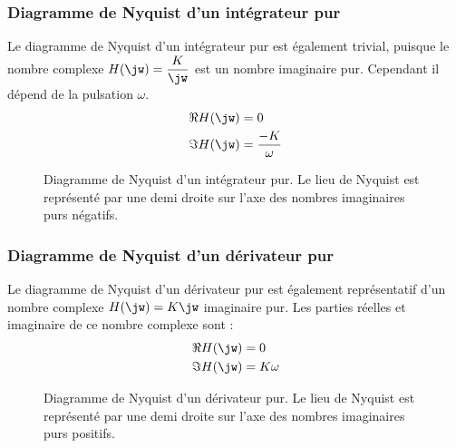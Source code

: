 \subsubsection{Diagramme de Nyquist d'un intégrateur pur}
Le diagramme de Nyquist d'un intégrateur pur est également trivial, puisque 
le nombre complexe $H(\jw)=\dfrac{K}{\jw}$ est un nombre imaginaire pur. 
Cependant il dépend de la pulsation $\omega$.
\begin{align*}
    \Re{H(\jw)}&=0\\
    \Im{H(\jw)}&=\dfrac{-K}{\omega}
\end{align*}
\begin{figure}[!h]
    \centering
    
    \caption{Diagramme de Nyquist d'un intégrateur pur. Le lieu de Nyquist 
             est représenté par une demi droite sur l'axe des nombres 
             imaginaires purs négatifs.\label{fig-nyquist_2}}
\end{figure}
\newpage
\subsubsection{Diagramme de Nyquist d'un dérivateur pur}
Le diagramme de Nyquist d'un dérivateur pur est également représentatif d'un 
nombre complexe $H(\jw)=K\jw$ imaginaire pur. Les parties réelles et imaginaire
de ce nombre complexe sont :
\begin{align*}
    \Re{H(\jw)}&=0\\
    \Im{H(\jw)}&=K\omega
\end{align*}
\begin{figure}[!h]
    \centering
    
    \caption{Diagramme de Nyquist d'un dérivateur pur. Le lieu de Nyquist 
             est représenté par une demi droite sur l'axe des nombres 
             imaginaires purs positifs.\label{fig-nyquist_3}}
\end{figure}
\newpage
